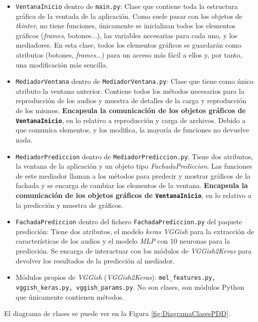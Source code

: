 \begin{itemize}
\item \texttt{VentanaInicio} dentro de \texttt{main.py}: Clase que contiene toda la estructura gráfica de la ventada de la aplicación. Como suele pasar con los objetos de \textit{tkinter}, no tiene funciones, únicamente se inicializan todos los elementos gráficos (\textit{frames}, botones...), las variables necesarias para cada uno, y los mediadores. En esta clase, todos los elementos gráficos se guardarán como atributos (botones, \textit{frames}...) para un acceso más fácil a ellos y, por tanto, una modificación más sencilla.
\item \texttt{MediadorVentana} dentro de \texttt{MediadorVentana.py}: Clase que tiene como único atributo la ventana anterior. Contiene todos los métodos necesarios para la reproducción de los audios y muestra de detalles de la carga y reproducción de los mismos. \textbf{Encapsula la comunicación de los objetos gráficos de \texttt{VentanaInicio}}, en lo relativo a reproducción y carga de archivos. Debido a que comunica elementos, y los modifica, la mayoría de funciones no devuelve nada.
\item \texttt{MediadorPrediccion} dentro de \texttt{MediadorPrediccion.py}: Tiene dos atributos, la ventana de la aplicación y un objeto tipo \textit{FachadaPrediccion}. Las funciones de este mediador llaman a los métodos para predecir y mostrar gráficos de la fachada y se encarga de cambiar los elementos de la ventana. \textbf{Encapsula la comunicación de los objetos gráficos de \texttt{VentanaInicio}}, en lo relativo a la predicción y muestra de gráficos.
\item \texttt{FachadaPrediccion} dentro del fichero \texttt{FachadaPrediccion.py} del paquete predicción: Tiene dos atributos, el modelo \textit{keras VGGish} para la extracción de características de los audios y el modelo \textit{MLP} con 10 neuronas para la predicción. Se encarga de interactuar con los módulos de \textit{VGGish2Keras} para devolver los resultados de la predicción al mediador.
\item Módulos propios de \textit{VGGish} (\textit{VGGish2Keras}): \texttt{mel\_features.py, vggish\_keras.py, vggish\_params.py}. No son clases, son módulos Python que únicamente contienen métodos.
\end{itemize}
El diagrama de clases se puede ver en la Figura \ref{fig:DiagramaClasesPDD}. 



